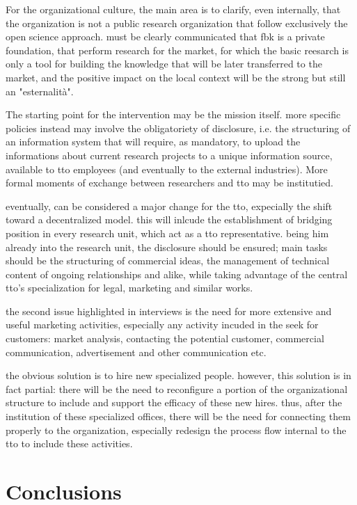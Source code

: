 For the organizational culture, the main area is to clarify, even internally, that the organization is not a public research organization that follow exclusively the open science approach. must be clearly communicated that fbk is a private foundation, that perform research for the market, for which the basic reesarch is only a tool for building the knowledge that will be later transferred to the market, and the positive impact on the local context will be the strong but still an "esternalità". 

The starting point for the intervention may be the mission itself. more specific policies instead may involve the obligatoriety of disclosure, i.e. the structuring of an information system that will require, as mandatory, to upload the informations about current research projects to a unique information source, available to tto employees (and eventually to the external industries). More formal moments of exchange between researchers and tto may be institutied.

eventually, can be considered a major change for the tto, expecially the shift toward a decentralized model. this will inlcude the establishment of bridging position in every research unit, which act as a tto representative. being him already into the research unit, the disclosure should be ensured; main tasks should be the structuring of commercial ideas, the management of technical content of ongoing relationships and alike, while taking advantage of the central tto's specialization for legal, marketing and similar works.

the second issue highlighted in interviews is the need for more extensive and useful marketing activities, especially any activity incuded in the seek for customers: market analysis, contacting the potential customer, commercial communication, advertisement and other communication etc. 

the obvious solution is to hire new specialized people. however, this solution is in fact partial: there will be the need to reconfigure a portion of the organizational structure to include and support the efficacy of these new hires. thus, after the institution of these specialized offices, there will be the need for connecting them properly to the organization, especially redesign the process flow internal to the tto to include these activities.

\section{Conclusions}

